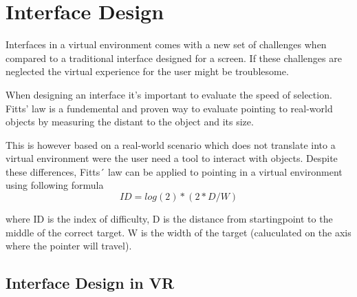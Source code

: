 \section{Interface Design}
Interfaces in a virtual environment comes with a new set of challenges when compared to a traditional interface designed for a screen. If these challenges are neglected the virtual experience for the user might be troublesome.

When designing an interface it's important to evaluate the speed of selection. Fitts' law is a fundemental and proven way to evaluate pointing to real-world objects by measuring the distant to the object and its size.

This is however based on a real-world scenario which does not translate into a virtual environment were the user need a tool to interact with objects. Despite these differences, Fitts´ law can be applied to pointing in a virtual environment using following formula  \cite{interface:card1978evaluation}
\begin{equation}
ID = log(2) * ( 2* D / W )
\end{equation}

where ID is the index of difficulty, D is the distance from startingpoint to the middle of the correct target. W is the width of the target (caluculated  on the axis where the pointer will travel).

\subsection {Interface Design in VR}
